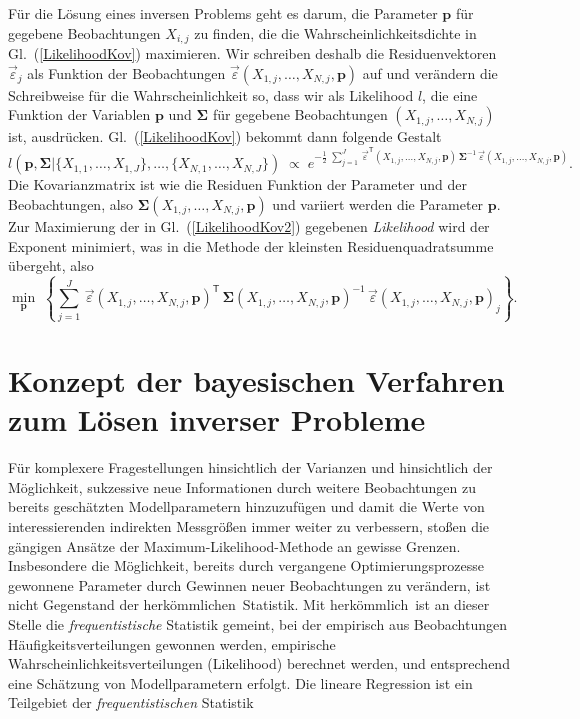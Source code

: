 Für die Lösung eines inversen Problems geht es darum, die Parameter $\mathbf{p}$
für gegebene Beobachtungen $X_{i,j}$ zu finden, die die Wahrscheinlichkeitsdichte
in Gl.~(\ref{LikelihoodKov}) maximieren. Wir schreiben deshalb die Residuenvektoren $\vec \varepsilon_j$ als Funktion
der Beobachtungen $\vec \varepsilon(X_{1,j},\dots,X_{N,j},\mathbf{p})$ auf und verändern die Schreibweise
für die Wahrscheinlichkeit so, dass wir als Likelihood $l$, die eine Funktion der
Variablen $\mathbf{p}$ und $\boldsymbol{\Sigma}$ für gegebene Beobachtungen $(X_{1,j},\dots,X_{N,j})$ ist,
ausdrücken. Gl.~(\ref{LikelihoodKov}) bekommt dann folgende Gestalt
\begin{equation}
l(\mathbf{p}, \boldsymbol{\Sigma} | \{X_{1,1}, \dots, X_{1,J}\}, \dots, \{X_{N,1}, \dots, X_{N,J}\} ) \; \propto \;
e^{-\frac{1}{2} \; \sum\limits_{j=1}^J \, \vec \varepsilon^\mathsf{T}(X_{1,j},\dots,X_{N,j},\mathbf{p}) \, \boldsymbol{\Sigma}^{-1} \, \vec \varepsilon(X_{1,j},\dots,X_{N,j},\mathbf{p}) } .
\label{LikelihoodKov2}
\end{equation}
Die Kovarianzmatrix ist wie die Residuen Funktion der Parameter und der Beobachtungen,
also $\boldsymbol{\Sigma}(X_{1,j},\dots,X_{N,j},\mathbf{p})$ und
variiert werden die Parameter $\mathbf{p}$.
Zur Maximierung der in Gl.~(\ref{LikelihoodKov2}) gegebenen
\textsl{Likelihood} wird der Exponent minimiert, was in die Methode der kleinsten Residuenquadratsumme
übergeht, also
\begin{equation}
\min_{\mathbf{p}} \; \left\{
 \sum\limits_{j=1}^J \, \vec \varepsilon(X_{1,j},\dots,X_{N,j},\mathbf{p})^\mathsf{T} \,
\boldsymbol{\Sigma}(X_{1,j},\dots,X_{N,j},\mathbf{p})^{-1} \, \vec \varepsilon(X_{1,j},\dots,X_{N,j},\mathbf{p})_j \right\} .
\end{equation}

\section{Konzept der bayesischen Verfahren zum Lösen inverser Probleme}
\label{bayeskonzept}

Für komplexere Fragestellungen hinsichtlich der Varianzen und hinsichtlich der Möglichkeit,
sukzessive neue Informationen durch weitere Beobachtungen zu bereits geschätzten Modellparametern
hinzuzufügen und damit die Werte von
interessierenden indirekten Messgrößen immer weiter zu verbessern, stoßen die gängigen Ansätze
der Maximum-Likelihood-Methode an gewisse Grenzen. Insbesondere die Möglichkeit, bereits durch
vergangene Optimierungsprozesse gewonnene Parameter durch Gewinnen neuer Beobachtungen zu verändern,
ist nicht Gegenstand der \glqq herkömmlichen\grqq ~Statistik. Mit \glqq herkömmlich\grqq ~ist
an dieser Stelle die \textsl{frequentistische} Statistik gemeint, bei der empirisch aus
Beobachtungen Häufigkeitsverteilungen gewonnen werden, empirische Wahrscheinlichkeitsverteilungen
(Likelihood) berechnet werden, und entsprechend eine Schätzung von Modellparametern erfolgt.
Die lineare Regression ist ein Teilgebiet der \textsl{frequentistischen} Statistik

